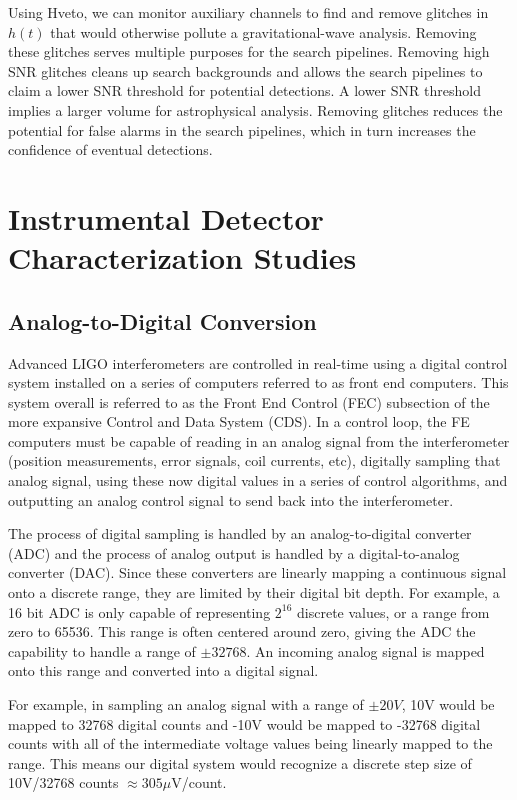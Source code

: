 Using Hveto, we can monitor auxiliary channels to find and remove glitches 
in $h(t)$ that would otherwise pollute a gravitational-wave analysis. Removing 
these glitches serves multiple purposes for the search pipelines. Removing 
high SNR glitches cleans up search backgrounds and allows the search 
pipelines to claim a lower SNR threshold for potential detections. A lower 
SNR threshold implies a larger volume for astrophysical analysis. Removing 
glitches reduces the potential for false alarms in the search pipelines, 
which in turn increases the confidence of eventual detections.

\section{Instrumental Detector Characterization Studies}

\subsection{Analog-to-Digital Conversion}

Advanced LIGO interferometers are controlled in real-time using a digital 
control system installed on a series of computers referred to as front end 
computers.  This system overall is referred to as the Front End Control 
(FEC) subsection of the more expansive Control and Data System (CDS).  
In a control loop, the FE computers must be capable of reading in an 
analog signal from the interferometer (position measurements, error signals, 
coil currents, etc), digitally sampling that analog signal, using these now 
digital values in a series of control algorithms, and outputting an analog 
control signal to send back into the interferometer.

The process of digital sampling is handled by an analog-to-digital 
converter (ADC) and the process of analog output is handled by a 
digital-to-analog converter (DAC).  Since these converters are linearly 
mapping a continuous signal onto a discrete range, they are limited by 
their digital bit depth.  For example, a 16 bit ADC is only capable of 
representing $2^{16}$ discrete values, or a range from zero to 65536.  
This range is often centered around zero, giving the ADC the capability 
to handle a range of $\pm32768$.  An incoming analog signal is mapped 
onto this range and converted into a digital signal.

For example, in sampling an analog signal with a range of $\pm20V$, 
10V would be mapped to 32768 digital counts and -10V would be mapped 
to -32768 digital counts with all 
of the intermediate voltage values being linearly mapped to the range. This 
means our digital system would recognize a discrete step size of 
10V/32768 counts $\approx 305 \mu $V/count.

